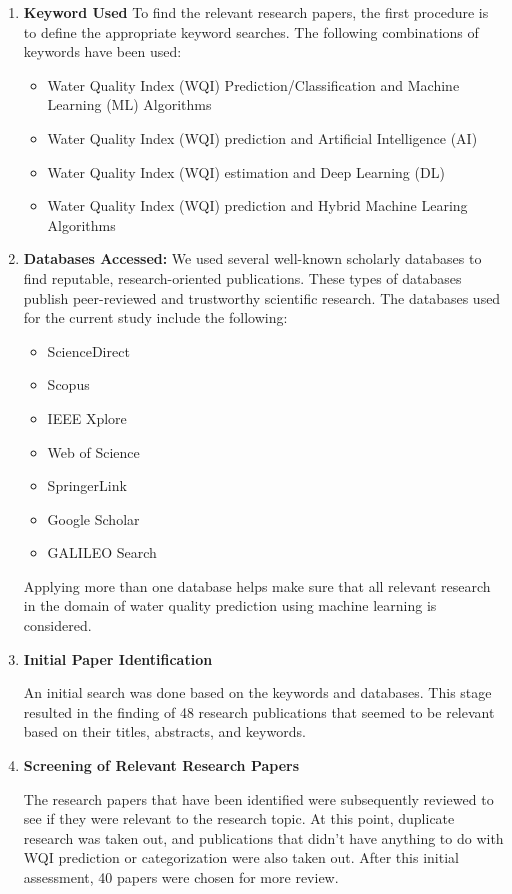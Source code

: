 \documentclass[conference]{IEEEtran}
\begin{document}
\begin{enumerate}[{(1)}]
\item \textbf{Keyword Used}
To find the relevant research papers, the first procedure is to define the appropriate keyword searches.  The following combinations of keywords have been used:

\begin{itemize}
    \item Water Quality Index (WQI) Prediction/Classification and Machine Learning (ML) Algorithms
    \item Water Quality Index (WQI) prediction and Artificial Intelligence (AI)
    \item Water Quality Index (WQI) estimation and Deep Learning (DL)
    \item Water Quality Index (WQI) prediction and Hybrid Machine Learing Algorithms
\end{itemize}

\item {\textbf{Databases Accessed:}}
We used several well-known scholarly databases to find reputable, research-oriented publications. These types of databases publish peer-reviewed and trustworthy scientific research. The databases used for the current study include the following:
\begin{itemize}
    \item ScienceDirect
    \item Scopus
    \item IEEE Xplore
    \item Web of Science
    \item SpringerLink
    \item Google Scholar
    \item GALILEO Search

\end{itemize}
Applying more than one database helps make sure that all relevant research in the domain of water quality prediction using machine learning is considered.


\item \textbf{Initial Paper Identification}

An initial search was done based on the keywords and databases. This stage resulted in the finding of 48 research publications that seemed to be relevant based on their titles, abstracts, and keywords.


\item \textbf{Screening of Relevant Research Papers}

The research papers that have been identified were subsequently reviewed to see if they were relevant to the research topic. At this point, duplicate research was taken out, and publications that didn't have anything to do with WQI prediction or categorization were also taken out. After this initial assessment, 40 papers were chosen for more review.


\end{enumerate}
\end{document}
